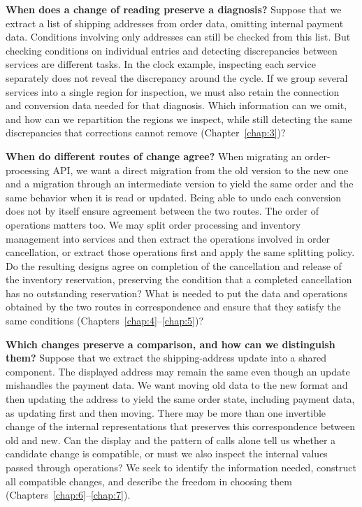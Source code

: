 \textbf{When does a change of reading preserve a diagnosis?}
Suppose that we extract a list of shipping addresses from order data, omitting
internal payment data. Conditions involving only addresses can still be
checked from this list. But checking conditions on individual entries and
detecting discrepancies between services are different tasks. In the clock
example, inspecting each service separately does not reveal the discrepancy
around the cycle. If we group several services into a single region for
inspection, we must also retain the connection and conversion data needed
for that diagnosis. Which information can we omit, and how can we repartition
the regions we inspect, while still detecting the same discrepancies that
corrections cannot remove (Chapter~\ref{chap:3})?

\textbf{When do different routes of change agree?}
When migrating an order-processing API, we want a direct migration from the
old version to the new one and a migration through an intermediate version to
yield the same order and the same behavior when it is read or updated.
Being able to undo each conversion does not by itself ensure agreement
between the two routes.
The order of operations matters too. We may split order processing and
inventory management into services and then extract the operations involved
in order cancellation, or extract those operations first and apply the same
splitting policy. Do the resulting designs agree on completion of the
cancellation and release of the inventory reservation, preserving the condition
that a completed cancellation has no outstanding reservation? What is needed
to put the data and operations obtained by the two routes in correspondence
and ensure that they satisfy the same conditions
(Chapters~\ref{chap:4}--\ref{chap:5})?

\textbf{Which changes preserve a comparison, and how can we distinguish them?}
Suppose that we extract the shipping-address update into a shared component.
The displayed address may remain the same even though an update mishandles
the payment data. We want moving old data to the new format and then updating
the address to yield the same order state, including payment data, as updating
first and then moving. There may be more than one invertible change of the internal representations
that preserves this correspondence between old and new.
Can the display and the pattern of calls alone tell us whether a candidate
change is compatible, or must we also inspect the internal values passed
through operations? We seek to identify the information needed, construct all
compatible changes, and describe the freedom in choosing them
(Chapters~\ref{chap:6}--\ref{chap:7}).

